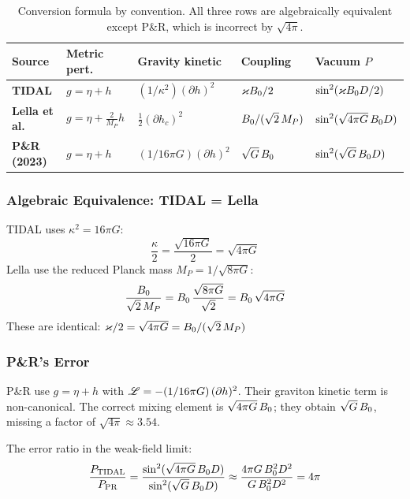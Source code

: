 \begin{table}[htbp]
\centering
\caption{Conversion formula by convention. All three rows are algebraically equivalent except P\&R, which is incorrect by $\sqrt{4\pi}$.}
\label{tab:conventions}
\begin{tabular}{@{}lllll@{}}
\toprule
Source & Metric pert.\ & Gravity kinetic & Coupling & Vacuum $P$ \\
\midrule
\textbf{TIDAL} & $g = \eta + h$ & $(1/\kappa^2)(\partial h)^2$ & $\varkappa B_0/2$ & $\sin^2(\varkappa B_0 D/2)$ \\
\textbf{Lella et al.}~\cite{lella2024constraining} & $g = \eta + \tfrac{2}{M_P}h$ & $\tfrac{1}{2}(\partial h_c)^2$ & $B_0/(\sqrt{2}\,M_P)$ & $\sin^2(\sqrt{4\pi G}\,B_0 D)$ \\
\textbf{P\&R (2023)} & $g = \eta + h$ & $(1/16\pi G)(\partial h)^2$ & $\sqrt{G}\,B_0$ & $\sin^2(\sqrt{G}\,B_0 D)$ \\
\bottomrule
\end{tabular}
\end{table}

\subsubsection{Algebraic Equivalence: TIDAL = Lella}

TIDAL uses $\kappa^2 = 16\pi G$:
\begin{equation}
  \frac{\kappa}{2} = \frac{\sqrt{16\pi G}}{2} = \sqrt{4\pi G}
\end{equation}
Lella use the reduced Planck mass $M_P = 1/\sqrt{8\pi G}$:
\begin{equation}
  \frac{B_0}{\sqrt{2}\,M_P} = B_0\,\frac{\sqrt{8\pi G}}{\sqrt{2}} = B_0\,\sqrt{4\pi G}
\end{equation}
These are identical: $\varkappa/2 = \sqrt{4\pi G} = B_0/(\sqrt{2}\,M_P)$~\checkmark

\subsubsection{P\&R's Error}

P\&R use $g = \eta + h$ with $\mathscr{L} = -(1/16\pi G)\,(\partial h)^2$. Their graviton kinetic term is non-canonical. The correct mixing element is $\sqrt{4\pi G}\,B_0$; they obtain $\sqrt{G}\,B_0$, missing a factor of $\sqrt{4\pi} \approx 3.54$.

The error ratio in the weak-field limit:
\begin{equation}
  \frac{P_\text{TIDAL}}{P_\text{PR}} = \frac{\sin^2(\sqrt{4\pi G}\,B_0 D)}{\sin^2(\sqrt{G}\,B_0 D)} \approx \frac{4\pi G\,B_0^2 D^2}{G\,B_0^2 D^2} = 4\pi
\end{equation}


